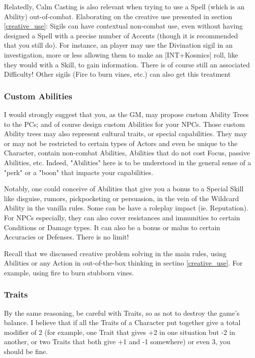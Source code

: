 Relatedly, Calm Casting is also relevant when trying to use a Spell (which is an Ability) out-of-combat. Elaborating on the creative use presented in section \ref{creative_use}: Sigils can have contextual non-combat use, even without having designed a Spell with a precise number of Accents (though it is recommended that you still do). For instance, an player may use the Divination sigil in an investigation, more or less allowing them to make an [INT+Kosmics] roll, like they would with a Skill, to gain information. There is of course still an associated Difficulty! Other sigils (Fire to burn vines, etc.) can also get this treatment



\subsubsection{Custom Abilities}

\label{balancing_abilities}

I would strongly suggest that you, as the GM, may propose custom Ability Trees to the PCs; and of course design custom Abilities for your NPCs.
Those custom Ability trees may also represent cultural traits, or special capabilities. They may or may not be restricted to certain types of Actors and even be unique to the Character, contain non-combat Abilities, Abilities that do not cost Focus, passive Abilities, etc. Indeed, "Abilities" here is to be understood in the general sense of a "perk" or a "boon" that impacts your capabilities.

Notably, one could conceive of Abilities that give you a bonus to a Special Skill like disguise, rumors, pickpocketing or persuasion, in the vein of the Wildcard Ability in the vanilla rules. Some can be have a roleplay impact (ie. Reputation). For NPCs especially, they can also cover resistances and immunities to certain Conditions or Damage types. It can also be a bonus or malus to certain Accuracies or Defenses. There is no limit!

Recall that we discussed creative problem solving in the main rules, using Abilities or any Action in out-of-the-box thinking in sectino \ref{creative_use}. For example, using fire to burn stubborn vines.

\subsubsection{Traits}

By the same reasoning, be careful with Traits, so as not to destroy the game's balance. I believe that if all the Traits of a Character put together give a total modifier of 2 (for example, one Trait that gives +2 in one situation but -2 in another, or two Traits that both give +1 and -1 somewhere) or even 3, you should be fine. 

